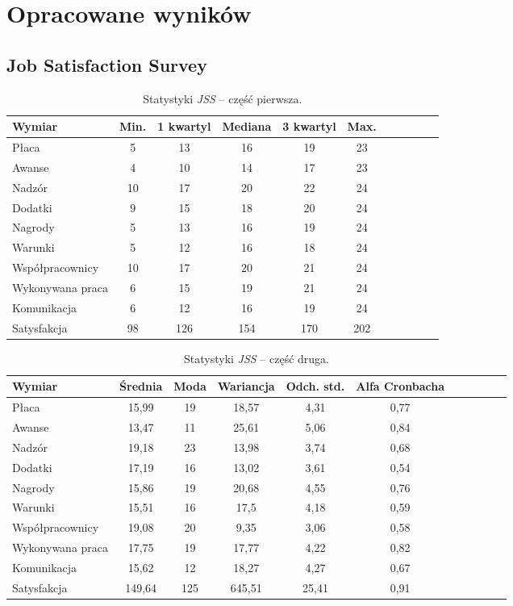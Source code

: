 \section{Opracowane wyników}
\subsection{Job Satisfaction Survey}

\begin{table}[h!]
\begin{center}
\begin{tabular}{l | c c c c c c c c c c}
Wymiar & Min. & 1 kwartyl & Mediana & 3 kwartyl & Max.\\ \hline \hline
Płaca & 5 & 13 & 16 & 19 & 23 \\ 
Awanse & 4 & 10 & 14 & 17 & 23 \\
Nadzór & 10 & 17 & 20 & 22 & 24 \\
Dodatki & 9 & 15 & 18 & 20 & 24 \\
Nagrody & 5 & 13 & 16 & 19 & 24 \\
Warunki & 5 & 12 & 16 & 18 & 24 \\
Współpracownicy & 10 & 17 & 20 & 21 & 24 \\
Wykonywana praca & 6 & 15 & 19 & 21 & 24 \\
Komunikacja & 6 & 12 & 16 & 19 & 24 \\ \hline
Satysfakcja & 98 & 126 & 154 & 170 & 202 \\ \hline
\end{tabular}
\end{center}
\caption{Statystyki \emph{JSS} -- część pierwsza.}
\label{tab:jss-stats-1}
\end{table}

\begin{table}[h!]
\begin{center}
\begin{tabular}{l | c c c c c c c c c c}
Wymiar & Średnia & Moda & Wariancja & Odch. std. & Alfa Cronbacha\\ \hline \hline
Płaca & 15,99 & 19 & 18,57 & 4,31 & 0,77 \\
Awanse & 13,47 & 11 & 25,61 & 5,06 & 0,84 \\
Nadzór & 19,18 & 23 & 13,98 & 3,74 & 0,68 \\
Dodatki & 17,19 & 16 & 13,02 & 3,61 & 0,54 \\
Nagrody & 15,86 & 19 & 20,68 & 4,55 & 0,76 \\
Warunki & 15,51 & 16 & 17,5 & 4,18 & 0,59 \\
Współpracownicy & 19,08 & 20 & 9,35 & 3,06 & 0,58 \\
Wykonywana praca & 17,75 & 19 & 17,77 & 4,22 & 0,82 \\
Komunikacja & 15,62 & 12 & 18,27 & 4,27 & 0,67 \\ \hline
Satysfakcja & 149,64 & 125 & 645,51 & 25,41 & 0,91 \\ \hline
\end{tabular}
\end{center}
\caption{Statystyki \emph{JSS} -- część druga.}
\label{tab:jss-stats-2}
\end{table}

